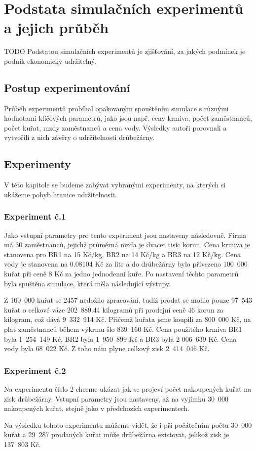 \documentclass[a4paper,10pt]{article}
\begin{document}
\section{Podstata simulačních experimentů a jejich průběh}\label{experimenty}
TODO\newline
Podstatou simulačních experimentů je zjišťování, za jakých podmínek je podnik ekonomicky udržitelný.
\subsection{Postup experimentování}
Průběh experimentů probíhal opakovaným spouštěním simulace s různými hodnotami klíčových parametrů, jako
jsou např. ceny krmiva, počet zaměstnanců, počet kuřat, mzdy zaměstnanců a cena vody.
Výsledky autoři porovnali a vytvořili z nich závěry o udržitelnosti drůbežárny.

\subsection{Experimenty}
V této kapitole se budeme zabývat vybranými experimenty, na kterých si ukážeme pohyb hranice udržitelnosti.
\subsubsection{Experiment č.1}
Jako vstupní parametry pro tento experiment jsou nastaveny následovně.
Firma má 30 zaměstnanců, jejichž průměrná mzda je dvacet tisíc korun.
Cena krmiva je stanovena pro BR1 na 15 Kč/kg, BR2 na 14 Kč/kg a BR3 na 12 Kč/kg.
Cena vody je stanovena na 0.08104 Kč za litr a do drůbežárny bylo přivezeno 100~000 kuřat při 
ceně 8 Kč za jedno jednodenní kuře.
Po nastavení těchto parametrů byla spuštěna simulace, která měla následující výstupy.
\par
Z 100~000 kuřat se 2457 nedožilo zpracování, tudíž prodat se mohlo pouze 97~543 kuřat o celkové
váze 202~889.44 kilogramů při prodejní ceně 46 korun za kilogram, což dává 9~332~914 Kč.
Přičemž kuřata jsme koupili za 800~000 Kč, na plat zaměstnanců během výkrmu šlo 839~160 Kč.
Cena použitého krmiva BR1 byla 1~254~149 Kč, BR2 byla 1~950~899 Kč a BR3 byla 2 006~639 Kč.
Cena vody byla 68~022 Kč. Z toho nám plyne celkový zisk 2~414~046 Kč.
\subsubsection{Experiment č.2}
Na experimentu číslo 2 chceme ukázat jak se projeví počet nakoupených kuřat na 
zisk drůbežárny. Vstupní parametry jsou nastaveny, až na vyjímku 30~000 nakoupených kuřat, stejně
jako v předchozích experimentech.
\par
Na výsledku tohoto experimentu můžeme vidět, že i při počátečním počtu 30~000 kuřat 
a 29~287 prodaných kuřat může drůbežárna existovat, jelikož zisk je 137~803 Kč.
\end{document}
